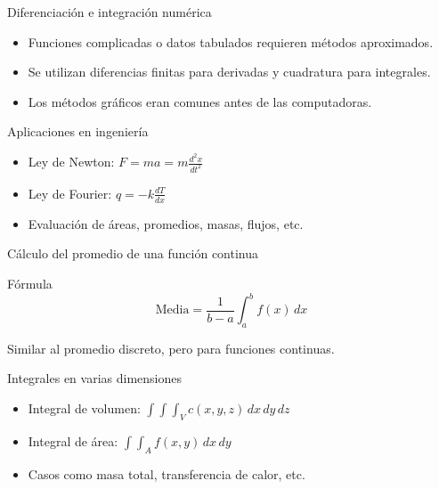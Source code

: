 \documentclass[main.tex]{subfiles}
\begin{document}
\begin{frame}{Diferenciación e integración numérica}
  \begin{itemize}
    \item Funciones complicadas o datos tabulados requieren métodos aproximados.
    \item Se utilizan diferencias finitas para derivadas y cuadratura para integrales.
    \item Los métodos gráficos eran comunes antes de las computadoras.
  \end{itemize}
\end{frame}

\begin{frame}{Aplicaciones en ingeniería}
  \begin{itemize}
    \item Ley de Newton: \( F = ma = m \frac{d^2x}{dt^2} \)
    \item Ley de Fourier: \( q = -k \frac{dT}{dx} \)
    \item Evaluación de áreas, promedios, masas, flujos, etc.
  \end{itemize}
\end{frame}

\begin{frame}{Cálculo del promedio de una función continua}
  \begin{block}{Fórmula}
    \[ \text{Media} = \frac{1}{b - a} \int_a^b f(x) \, dx \]
  \end{block}
  Similar al promedio discreto, pero para funciones continuas.
\end{frame}

\begin{frame}{Integrales en varias dimensiones}
  \begin{itemize}
    \item Integral de volumen: \( \int\int\int_V c(x,y,z) \, dx\,dy\,dz \)
    \item Integral de área: \( \int\int_A f(x,y) \, dx\,dy \)
    \item Casos como masa total, transferencia de calor, etc.
  \end{itemize}
\end{frame}
\end{document}
